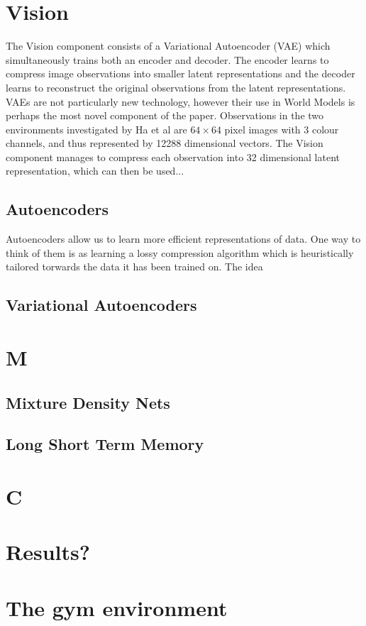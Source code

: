 \documentclass{article}
\theoremstyle{definition}
\begin{document}



\section{Vision}
The Vision component consists of a Variational Autoencoder (VAE) which simultaneously trains both an encoder and decoder.
The encoder learns to compress image observations into smaller latent representations and the decoder learns to reconstruct the original observations from the latent representations.
VAEs are not particularly new technology, however their use in World Models is perhaps the most novel component of the paper. %
Observations in the two environments investigated by Ha et al are $64 \times 64$ pixel images with 3 colour channels, and thus represented by 12288 dimensional vectors.
The Vision component manages to compress each observation into 32 dimensional latent representation, which can then be used...



\subsection{Autoencoders}
Autoencoders allow us to learn more efficient representations of data.
One way to think of them is as learning a lossy compression algorithm which is heuristically tailored torwards the data it has been trained on.
The idea 



\subsection{Variational Autoencoders}



\section{M}

\subsection{Mixture Density Nets}

\subsection{Long Short Term Memory}

\section{C}

\section{Results?}

\section{The gym environment}

% 
\end{document}
